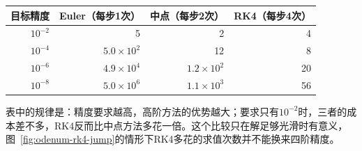 \begin{BookInlineTable}
 \centering
 \caption{式~\eqref{eq:odenum-running}上使$t=1$处误差不超过给定精度所需的右端求值次数（步数以约$3\%$递增搜索，故为近似值）。}
 \label{tab:odenum-cost}
 \begin{tabular}{rrrr}
  \toprule
  目标精度 & Euler（每步1次） & 中点（每步2次） & RK4（每步4次）\\
  \midrule
  $10^{-2}$ & 5 & 2 & 4\\
  $10^{-4}$ & $5.0\times10^{2}$ & 12 & 8\\
  $10^{-6}$ & $4.9\times10^{4}$ & $1.2\times10^{2}$ & 20\\
  $10^{-8}$ & $5.0\times10^{6}$ & $1.1\times10^{3}$ & 56\\
  \bottomrule
 \end{tabular}
\end{BookInlineTable}

表中的规律是：精度要求越高，高阶方法的优势越大；要求只有$10^{-2}$时，三者的成本差不多，RK4反而比中点方法多花一倍。这个比较只在解足够光滑时有意义，图~\ref{fig:odenum-rk4-jump}的情形下RK4多花的求值次数并不能换来四阶精度。


